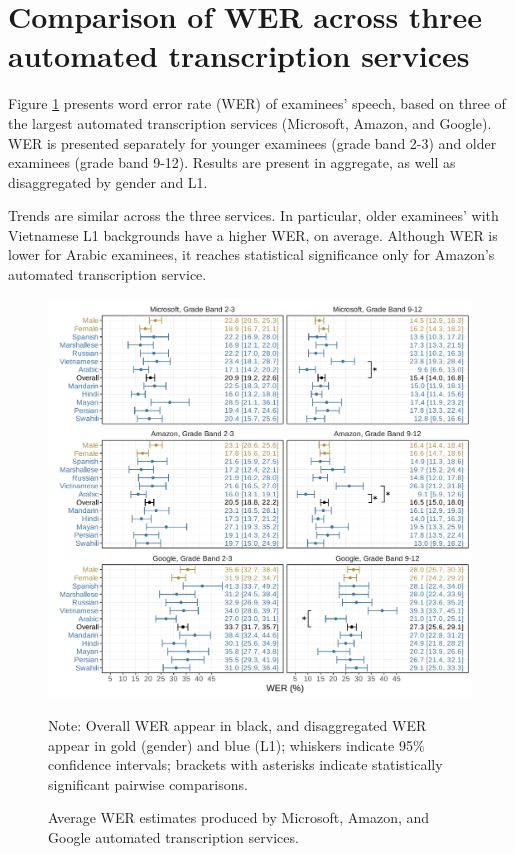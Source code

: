 \documentclass [PhD] {uclathes}
\begin{document}
\section{Comparison of WER across three automated transcription services}
\label{sec:appendix_wer}

Figure \ref{fig:wer_all} presents word error rate (WER) of examinees' speech, based on three of the largest automated transcription services (Microsoft, Amazon, and Google). WER is presented separately for younger examinees (grade band 2-3) and older examinees (grade band 9-12). Results are present in aggregate, as well as disaggregated by gender and L1. 

Trends are similar across the three services. In particular, older examinees' with Vietnamese L1 backgrounds have a higher WER, on average. Although WER is lower for Arabic examinees, it reaches statistical significance only for Amazon's automated transcription service. 

\begin{figure}[h]
    \centering
    \caption{Average WER estimates produced by Microsoft, Amazon, and Google automated transcription services.}
    \includegraphics[width=6.5in]{figures/20230513_adj_werPlot_sigBars.pdf}
    \label{fig:wer_all}
{Note: Overall WER appear in black, and disaggregated WER appear in gold (gender) and blue (L1); whiskers indicate 95\% confidence intervals; brackets with asterisks indicate statistically significant pairwise comparisons. \par}
\end{figure}
\end{document}
